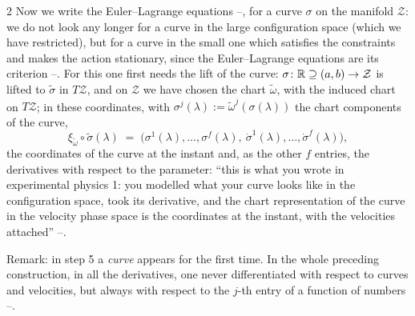 \begin{paracol}{2}
Now we write the Euler--Lagrange equations --, for a curve $\sigma$ on the manifold $\mathcal Z$: we do not look any longer for a curve in the large configuration space (which we have restricted), but for a curve in the small one which satisfies the constraints and makes the action stationary, since the Euler--Lagrange equations are its criterion --. For this one first needs the lift of the curve: $\sigma\colon\mathbb{R}\supseteq(a,b)\to\mathcal Z$ is lifted to $\tilde\sigma$ in $T\mathcal Z$, and on $\mathcal Z$ we have chosen the chart $\tilde\omega$, with the induced chart on $T\mathcal Z$; in these coordinates, with $\sigma^j(\lambda):=\tilde\omega^j(\sigma(\lambda))$ the chart components of the curve,
\begin{equation}\label{eq:pc-lift}
  \xi_{\tilde\omega}\circ\tilde\sigma(\lambda)\;=\;\bigl(\sigma^1(\lambda),\dots,\sigma^f(\lambda),\ \dot\sigma^1(\lambda),\dots,\dot\sigma^f(\lambda)\bigr),
\end{equation}
the coordinates of the curve at the instant and, as the other $f$ entries, the derivatives with respect to the parameter: ``this is what you wrote in experimental physics 1: you modelled what your curve looks like in the configuration space, took its derivative, and the chart representation of the curve in the velocity phase space is the coordinates at the instant, with the velocities attached'' --.

\begin{coursenote}\label{cn:pc-curve}
Remark: in step 5 a \emph{curve} appears for the first time. In the whole preceding construction, in all the derivatives, one never differentiated with respect to curves and velocities, but always with respect to the $j$-th entry of a function of numbers --.
\end{coursenote}


\end{paracol}
